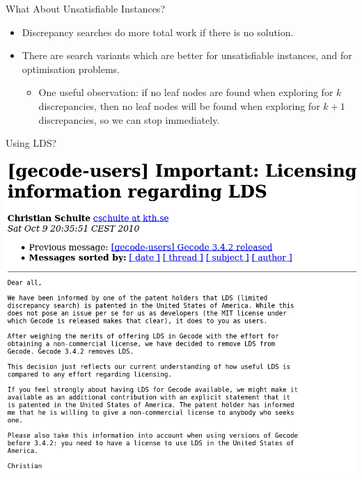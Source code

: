 \documentclass{beamer}
\begin{document}
\begin{frame}{What About Unsatisfiable Instances?}

    \begin{itemize}
        \item Discrepancy searches do more total work if there is no solution.

        \item There are search variants which are better for unsatisfiable instances, and for
            optimisation problems.

            \begin{itemize}
                \item One useful observation: if no leaf nodes are found when exploring for $k$
                    discrepancies, then no leaf nodes will be found when exploring for $k + 1$
                    discrepancies, so we can stop immediately.
            \end{itemize}
    \end{itemize}

\end{frame}

\begin{frame}{Using LDS?}
    \begin{center}
        \includegraphics*[keepaspectratio=true,scale=0.2]{lds-patent.png}
    \end{center}
\end{frame}
\end{document}
